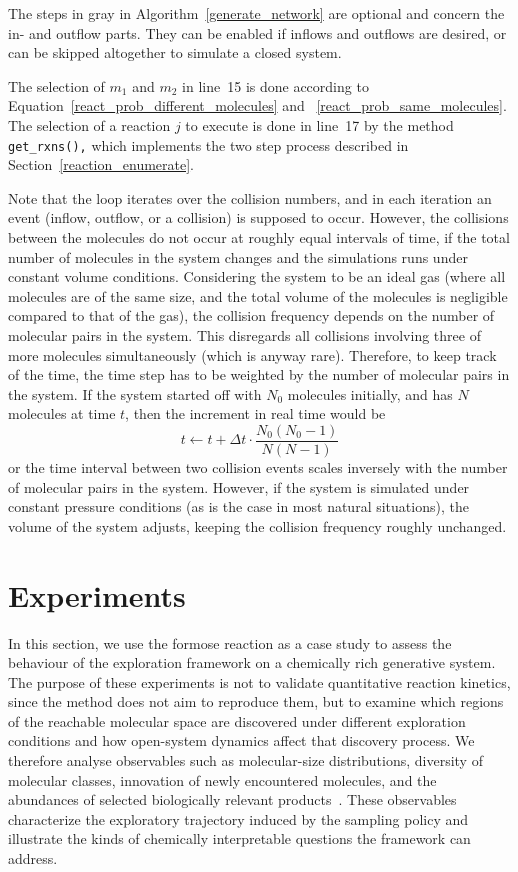 The steps in gray in Algorithm~\ref{generate_network} are optional and concern the in- and outflow parts. They can be enabled if inflows and outflows are desired, or can be skipped altogether to simulate a closed system.

The selection of $m_1$ and $m_2$ in line~15 is done according to Equation~\eqref{react_prob_different_molecules} and ~\eqref{react_prob_same_molecules}. The selection of a reaction $j$ to execute is done in line~17 by the method \texttt{get\_rxns(),} which implements the two step process described in Section~\ref{reaction_enumerate}.

Note that the loop iterates over the collision numbers, and in each iteration an event (inflow, outflow, or a collision) is supposed to occur.
However, the collisions between the molecules do not occur at roughly equal intervals of time,
if the total number of molecules in the system changes and the simulations runs under constant volume conditions.
Considering the system to be an ideal gas (where all molecules are of the same size, and the total volume of the molecules is negligible compared to that of the gas),
the collision frequency depends on the number of molecular pairs in the system.
This disregards all collisions involving three of more molecules simultaneously (which is anyway rare).
Therefore, to keep track of the time, the time step has to be weighted by the number of molecular pairs in the system.
If the system started off with $N_0$ molecules initially, and has $N$ molecules at time $t$, then the increment in real time would be
\begin{equation*}
    t \leftarrow t + \Delta t \cdot \frac{N_0(N_0-1)}{N(N-1)}
\end{equation*}
or the time interval between two collision events scales inversely with the number of molecular pairs in the system. However, if the system is simulated under constant pressure conditions (as is the case in most natural situations), the volume of the system adjusts, keeping the collision frequency roughly unchanged.

\section{Experiments}
\label{exp}

In this section, we use the formose reaction as a case study to assess the behaviour of the exploration framework on a chemically rich generative system. The purpose of these experiments is not to validate quantitative reaction kinetics, since the method does not aim to reproduce them, but to examine which regions of the reachable molecular space are discovered under different exploration conditions and how open-system dynamics affect that discovery process. We therefore analyse observables such as molecular-size distributions, diversity of molecular classes, innovation of newly encountered molecules, and the abundances of selected biologically relevant products~\cite{formose_prebiotic}. These observables characterize the exploratory trajectory induced by the sampling policy and illustrate the kinds of chemically interpretable questions the framework can address.

